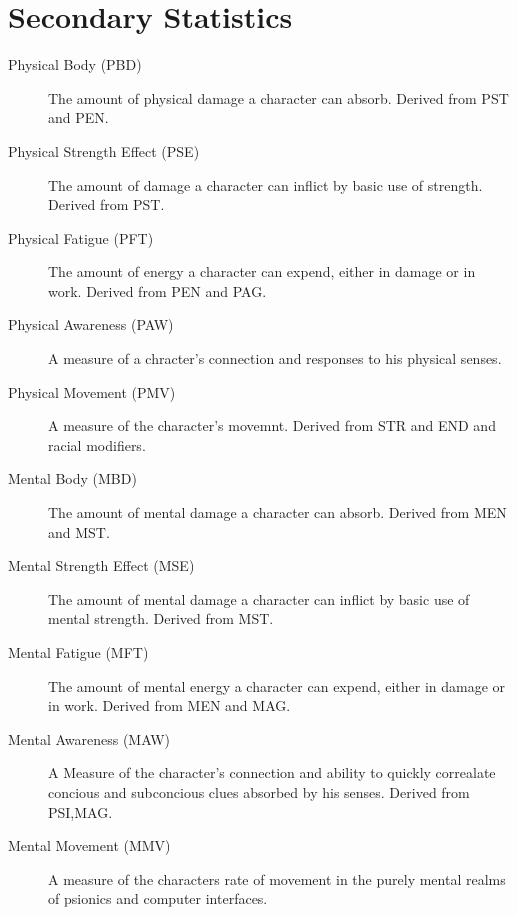\section{Secondary Statistics}
\begin{description}
	\item[Physical Body              (PBD)]
    The amount of physical damage a character can absorb. Derived from PST
    and PEN.
	\item[Physical Strength Effect   (PSE)]
    The amount of damage a character can inflict by basic use of strength.
    Derived from PST.
	\item[Physical Fatigue           (PFT)]
    The amount of energy a character can expend, either in damage or in
    work. Derived from PEN and PAG.
	\item[Physical Awareness         (PAW)]
    A measure of a chracter's connection and responses to his physical
    senses. 
	\item[Physical Movement           (PMV)]
    A measure of the character's movemnt. Derived from STR and END and
    racial modifiers.
	\item[Mental Body                (MBD)]
    The amount of mental damage a character can absorb. Derived from MEN and MST.
	\item[Mental Strength Effect     (MSE)]
    The amount of mental damage a character can inflict by basic use of
    mental strength. Derived from MST.
	\item[Mental Fatigue             (MFT)]
    The amount of mental energy a character can expend, either in damage
    or in work. Derived from MEN and MAG.
	\item[Mental Awareness           (MAW)]
    A Measure of the character's connection and ability to quickly correalate
    concious and subconcious clues absorbed by his senses. Derived from PSI,MAG.
    \item[Mental Movement (MMV)]
    A measure of the characters rate of movement in the purely mental 
	realms of psionics and computer interfaces.
\end{description}

